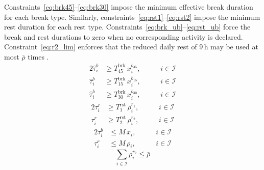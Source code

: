 Constraints~\eqref{eq:brk45}--\eqref{eq:brk30} impose the minimum effective break duration for each break type. Similarly, constraints~\eqref{eq:rst1}--\eqref{eq:rst2} impose the minimum rest duration for each rest type. Constraints~\eqref{eq:brk_ub}--\eqref{eq:rst_ub} force the break and rest durations to zero when no corresponding activity is declared. Constraint~\eqref{eq:r2_lim} enforces that the reduced daily rest of $9$\,h may be used at most $\bar \rho$ times .
\begin{alignat}{2}
    \hat{\tau}_i^b &\geq T^{\mathrm{brk}}_{45}\, x_i^{b_{45}}, &\quad& \, i \in \mathcal{I} \label{eq:brk45}\\
    \hat{\tau}_i^b &\geq T^{\mathrm{brk}}_{15}\, x_i^{b_{15}}, &\quad& \, i \in \mathcal{I} \label{eq:brk15}\\
    \hat{\tau}_i^b &\geq T^{\mathrm{brk}}_{30}\, x_i^{b_{30}}, &\quad& \, i \in \mathcal{I} \label{eq:brk30}
\end{alignat}
\begin{alignat}{2}
    \tau_i^r &\geq T^{\mathrm{rst}}_{1}\, \rho_i^{r_1}, &\quad& \, i \in \mathcal{I} \label{eq:rst1}\\
    \tau_i^r &\geq T^{\mathrm{rst}}_{2}\, \rho_i^{r_2}, &\quad& \, i \in \mathcal{I} \label{eq:rst2}
\end{alignat}
\begin{alignat}{2}
    \tau_i^b &\leq M\, x_i,    &\quad& \, i \in \mathcal{I} \label{eq:brk_ub}\\
    \tau_i^r &\leq M\, \rho_i, &\quad& \, i \in \mathcal{I} \label{eq:rst_ub}
\end{alignat}
\begin{equation}
    \sum_{i \in \mathcal{I}} \rho_i^{r_2} \leq \bar{\rho} \label{eq:r2_lim}
\end{equation}

